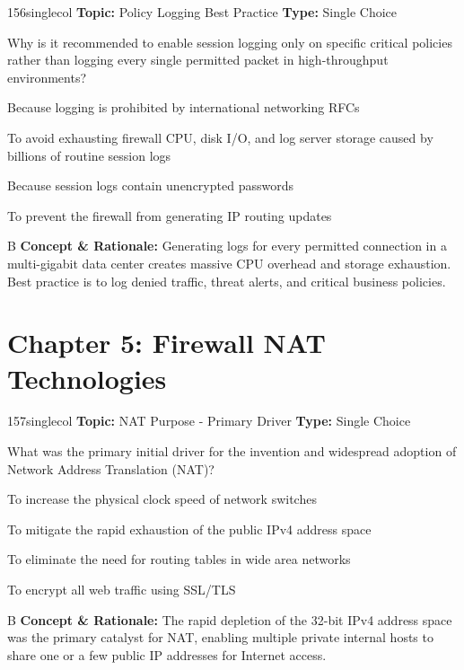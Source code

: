 \begin{qcard}{156}{singlecol}
\textcolor{darkslate!75}{\small\textbf{Topic:} Policy Logging Best Practice \hfill \textbf{Type:} Single Choice}\vspace{0.4em}\par
Why is it recommended to enable session logging only on specific critical policies rather than logging every single permitted packet in high-throughput environments?
\begin{qoptions}
\item Because logging is prohibited by international networking RFCs
\item To avoid exhausting firewall CPU, disk I/O, and log server storage caused by billions of routine session logs
\item Because session logs contain unencrypted passwords
\item To prevent the firewall from generating IP routing updates
\end{qoptions}
\end{qcard}
\nopagebreak
\begin{explainbox}{B}
\textbf{Concept \& Rationale:} Generating logs for every permitted connection in a multi-gigabit data center creates massive CPU overhead and storage exhaustion. Best practice is to log denied traffic, threat alerts, and critical business policies.
\end{explainbox}

\section{Chapter 5: Firewall NAT Technologies}

\begin{qcard}{157}{singlecol}
\textcolor{darkslate!75}{\small\textbf{Topic:} NAT Purpose - Primary Driver \hfill \textbf{Type:} Single Choice}\vspace{0.4em}\par
What was the primary initial driver for the invention and widespread adoption of Network Address Translation (NAT)?
\begin{qoptions}
\item To increase the physical clock speed of network switches
\item To mitigate the rapid exhaustion of the public IPv4 address space
\item To eliminate the need for routing tables in wide area networks
\item To encrypt all web traffic using SSL/TLS
\end{qoptions}
\end{qcard}
\nopagebreak
\begin{explainbox}{B}
\textbf{Concept \& Rationale:} The rapid depletion of the 32-bit IPv4 address space was the primary catalyst for NAT, enabling multiple private internal hosts to share one or a few public IP addresses for Internet access.
\end{explainbox}

